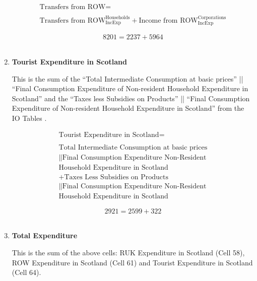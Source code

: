 \begin{enumerate}
\begin{equation}
\begin{split}
\text{Transfers from ROW} =  \\ \\
\text{Transfers from ROW}^\text{Households}_\text{IncExp}+\text{Income from ROW}^\text{Corporations}_\text{IncExp}
\end{split} \label{eq:2.5.67}
\end{equation}

\begin{equation} \nonumber
8201 = 2237+5964
\end{equation}\\



\item \textbf {Tourist Expenditure in Scotland}

This is the sum of the ``Total Intermediate Consumption at basic prices'' || ``Final Consumption Expenditure of Non-resident Household Expenditure in Scotland'' and the ``Taxes less Subsidies on Products'' || ``Final Consumption Expenditure of Non-resident Household Expenditure in Scotland'' from the IO Tables \cite{ScotGov2013a}.

\begin{equation}
\begin{split}
\text{Tourist Expenditure in Scotland} =  \\ \\
\text{Total Intermediate Consumption at basic prices}\\
\|\text{Final Consumption Expenditure Non-Resident}\\
\text{Household Expenditure in Scotland}\\
+\text{Taxes Less Subsidies on Products}\\
\|\text{Final Consumption Expenditure Non-Resident}\\
\text{Household Expenditure in Scotland}
\end{split} \label{eq:2.5.68}
\end{equation}

\begin{equation} \nonumber
2921 = 2599+322
\end{equation}\\


\item \textbf {Total Expenditure}

This is the sum of the above cells: RUK Expenditure in Scotland (Cell 58), ROW Expenditure in Scotland (Cell 61) and Tourist Expenditure in Scotland (Cell 64).


\end{enumerate}
